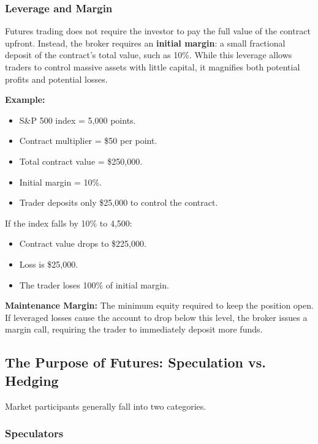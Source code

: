 \documentclass[12pt,openany]{book}
\begin{document}
\subsubsection{Leverage and Margin}

Futures trading does not require the investor to pay the full value of the contract upfront. Instead, the broker requires an \textbf{initial margin}: a small fractional deposit of the contract's total value, such as 10\%. While this leverage allows traders to control massive assets with little capital, it magnifies both potential profits and potential losses.

\textbf{Example:}

\begin{itemize}[leftmargin=*]
    \item S\&P 500 index = 5,000 points.
    \item Contract multiplier = \$50 per point.
    \item Total contract value = \$250,000.
    \item Initial margin = 10\%.
    \item Trader deposits only \$25,000 to control the contract.
\end{itemize}

If the index falls by 10\% to 4,500:

\begin{itemize}[leftmargin=*]
    \item Contract value drops to \$225,000.
    \item Loss is \$25,000.
    \item The trader loses 100\% of initial margin.
\end{itemize}

\textbf{Maintenance Margin:} The minimum equity required to keep the position open. If leveraged losses cause the account to drop below this level, the broker issues a margin call, requiring the trader to immediately deposit more funds.

\subsection{The Purpose of Futures: Speculation vs. Hedging}

Market participants generally fall into two categories.

\subsubsection{Speculators}
\end{document}
